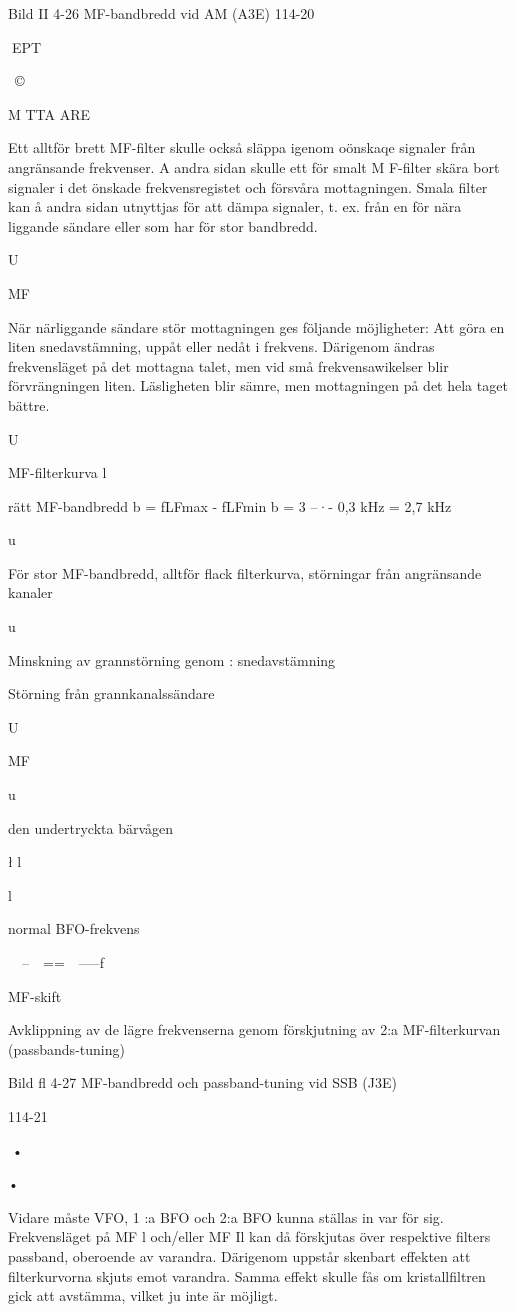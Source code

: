 Bild II 4-26 MF-bandbredd vid AM (A3E)
114-20

EPT

~©~

M TTA ARE

Ett alltför brett MF-filter skulle också
släppa igenom oönskaqe signaler från angränsande frekvenser. A andra sidan skulle
ett för smalt M F-filter skära bort signaler i det
önskade frekvensregistet och försvåra mottagningen. Smala filter kan å andra sidan
utnyttjas för att dämpa signaler, t. ex. från en
för nära liggande sändare eller som har för
stor bandbredd.

U

MF

När närliggande sändare stör mottagningen
ges följande möjligheter:
Att göra en liten snedavstämning, uppåt
eller nedåt i frekvens. Därigenom ändras frekvensläget på det mottagna talet, men vid små frekvensawikelser blir
förvrängningen liten. Läsligheten blir
sämre, men mottagningen på det hela
taget bättre.

U

MF-filterkurva
l

rätt MF-bandbredd
b = fLFmax - fLFmin
b = 3 --·- 0,3 kHz = 2,7 kHz

u

För stor MF-bandbredd, alltför
flack filterkurva, störningar från
angränsande kanaler

u

Minskning av grannstörning genom :
snedavstämning

Störning från grannkanalssändare

U

MF

u

den undertryckta
bärvågen

\l
l

l

normal BFO-frekvens

~~--~~==~~-----f

MF-skift

Avklippning av de lägre frekvenserna
genom förskjutning av 2:a MF-filterkurvan (passbands-tuning)

Bild fl 4-27 MF-bandbredd och passband-tuning vid SSB (J3E)

114-21

•

•

Vidare måste VFO, 1 :a BFO och 2:a BFO
kunna ställas in var för sig. Frekvensläget
på MF l och/eller MF Il kan då förskjutas
över respektive filters passband, oberoende av varandra. Därigenom uppstår
skenbart effekten att filterkurvorna skjuts
emot varandra. Samma effekt skulle fås
om kristallfiltren gick att avstämma, vilket
ju inte är möjligt.

